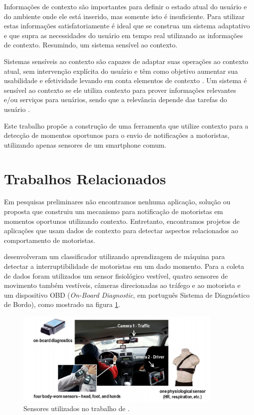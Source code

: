 Informações de contexto são importantes para definir o estado atual do usuário e do ambiente onde ele está inserido,
mas somente isto é insuficiente. Para utilizar estas informações satisfatoriamente é ideal que se construa um sistema
adaptativo e que supra as necessidades do usuário em tempo real utilizando as informações de contexto. Resumindo,
um sistema sensível ao contexto.

Sistemas sensíveis ao contexto são capazes de adaptar suas operações ao contexto atual, sem intervenção
explícita do usuário e têm como objetivo aumentar sua usabilidade e efetividade levando em conta elementos
de contexto \cite{baldauf2007survey}.  Um sistema é sensível ao contexto se ele utiliza contexto para prover
informações relevantes e/ou serviços para usuários, sendo que a relevância depende das tarefas do usuário
\cite{abowd1999towards}.

Este trabalho propõe a construção de uma ferramenta que utilize contexto para a detecção de momentos oportunos para
o envio de notificações a motoristas, utilizando apenas sensores de um smartphone comum.

\section{Trabalhos Relacionados}
\label{trabalhos-relacionados}

Em pesquisas preliminares não encontramos nenhuma aplicação, solução ou proposta que construiu um mecanismo para
notificação de motoristas em momentos oportunos utilizando contexto. Entretanto, encontramos projetos de aplicações que
usam dados de contexto para detectar aspectos relacionados ao comportamento de motoristas.

 desenvolveram um classificador utilizando aprendizagem de máquina para detectar a interruptibilidade
de motoristas em um dado momento. Para a coleta de dados foram utilizados um sensor fisiológico vestível, quatro sensores
de movimento também vestíveis, câmeras direcionadas ao tráfego e ao motorista e um dispositivo OBD (\textit{On-Board Diagnostic},
em português Sistema de Diagnóstico de Bordo), como mostrado na figura \ref{kim-sensors}.

\begin{figure}[h]
\centering
\includegraphics[width=0.9\textwidth]{images/kim-sensors.png}
\caption{Sensores utilizados no trabalho de .}
\label{kim-sensors}
\end{figure}

